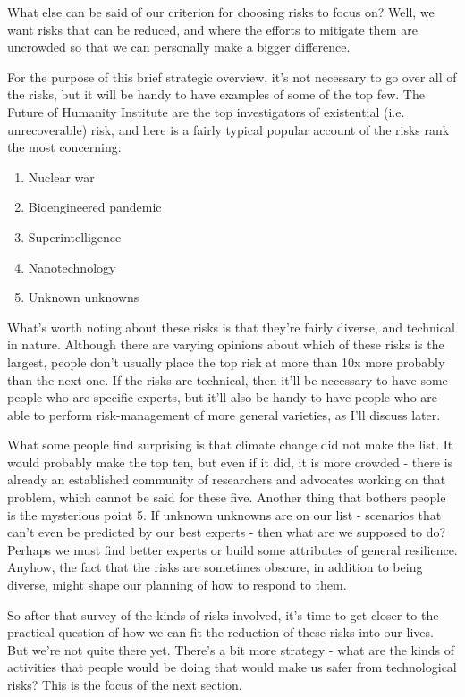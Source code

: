 ﻿\documentclass[12pt]{article}
\begin{document}
What else can be said of our criterion for choosing risks to focus on? Well, we want risks that can be reduced, and where the efforts to mitigate them are uncrowded so that we can personally make a bigger difference.

For the purpose of this brief strategic overview, it's not necessary to go over all of the risks, but it will be handy to have examples of some of the top few. The Future of Humanity Institute are the top investigators of existential (i.e. unrecoverable) risk, and here is a fairly typical popular account of the risks rank the most concerning:
\begin{enumerate}
    \item Nuclear war
    \item Bioengineered pandemic
    \item Superintelligence
    \item Nanotechnology
    \item Unknown unknowns
\end{enumerate}

What's worth noting about these risks is that they're fairly diverse, and technical in nature. Although there are varying opinions about which of these risks is the largest, people don't usually place the top risk at more than 10x more probably than the next one. If the risks are technical, then it'll be necessary to have some people who are specific experts, but it'll also be handy to have people who are able to perform risk-management of more general varieties, as I'll discuss later.

What some people find surprising is that climate change did not make the list. It would probably make the top ten, 
but even if it did, it is more crowded - there is already an established community of researchers and advocates 
working on that problem, which cannot be said for these five. Another thing that bothers people is the mysterious 
point 5. If unknown unknowns are on our list - scenarios that can't even be predicted by our best experts - then 
what are we supposed to do? Perhaps we must find better experts or build some attributes of general resilience. 
Anyhow, the fact that the risks are sometimes obscure, in addition to being diverse, might shape our planning of 
how to respond to them.

So after that survey of the kinds of risks involved, it's time to get closer to the practical question of how we can fit the reduction of these risks into our lives. But we're not quite there yet. There's a bit more strategy - what are the kinds of activities that people would be doing that would make us safer from technological risks? This is the focus of the next section.
\end{document}
